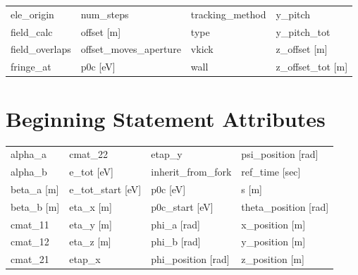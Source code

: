 \begin{tabular}{llll}
ele_origin                       & num_steps                        & tracking_method                  & y_pitch                          \\
field_calc                       & offset [m]                       & type                             & y_pitch_tot                      \\
field_overlaps                   & offset_moves_aperture            & vkick                            & z_offset [m]                     \\
fringe_at                        & p0c [eV]                         & wall                             & z_offset_tot [m]                 \\
 \bottomrule
 \end{tabular}
 \vfill
 
 \section{Beginning Statement Attributes}
 \label{s:list.beginning}
 
 \begin{tabular}{llll} \toprule
alpha_a                          & cmat_22                          & etap_y                           & psi_position [rad]               \\
alpha_b                          & e_tot [eV]                       & inherit_from_fork                & ref_time [sec]                   \\
beta_a [m]                       & e_tot_start [eV]                 & p0c [eV]                         & s [m]                            \\
beta_b [m]                       & eta_x [m]                        & p0c_start [eV]                   & theta_position [rad]             \\
cmat_11                          & eta_y [m]                        & phi_a [rad]                      & x_position [m]                   \\
cmat_12                          & eta_z [m]                        & phi_b [rad]                      & y_position [m]                   \\
cmat_21                          & etap_x                           & phi_position [rad]               & z_position [m]                   \\
 \bottomrule
 \end{tabular}
 \vfill
 
